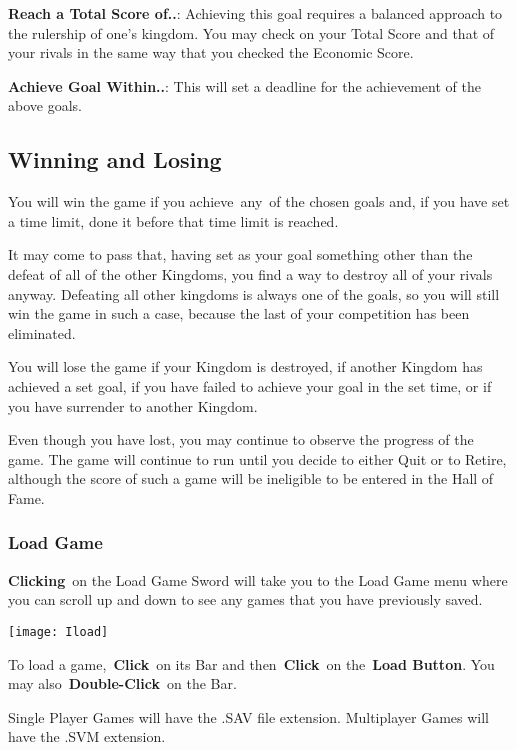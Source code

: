 \textbf{Reach a Total Score of..}: Achieving this goal requires a balanced approach to the rulership of one’s kingdom. You may check on your Total Score and that of your rivals in the same way that you checked the Economic Score.

\textbf{Achieve Goal Within..}: This will set a deadline for the achievement of the above goals.

\subsection{Winning and Losing}

You will win the game if you achieve any of the chosen goals and, if you have set a time limit, done it before that time limit is reached.

It may come to pass that, having set as your goal something other than the defeat of all of the other Kingdoms, you find a way to destroy all of your rivals anyway. Defeating all other kingdoms is always one of the goals, so you will still win the game in such a case, because the last of your competition has been eliminated.

You will lose the game if your Kingdom is destroyed, if another Kingdom has achieved a set goal, if you have failed to achieve your goal in the set time, or if you have surrender to another Kingdom.

Even though you have lost, you may continue to observe the progress of the game. The game will continue to run until you decide to either Quit or to Retire, although the score of such a game will be ineligible to be entered in the Hall of Fame.

\subsubsection{Load Game}


\textbf{Clicking} on the Load Game Sword will take you to the Load Game menu where you can scroll up and down to see any games that you have previously saved.

\begin{center}
	\texttt{[image: Iload]}
\end{center}

To load a game, \textbf{Click} on its Bar and then \textbf{Click} on the \textbf{Load Button}. You may also \textbf{Double-Click} on the Bar.

Single Player Games will have the .SAV file extension. Multiplayer Games will have the .SVM extension.

